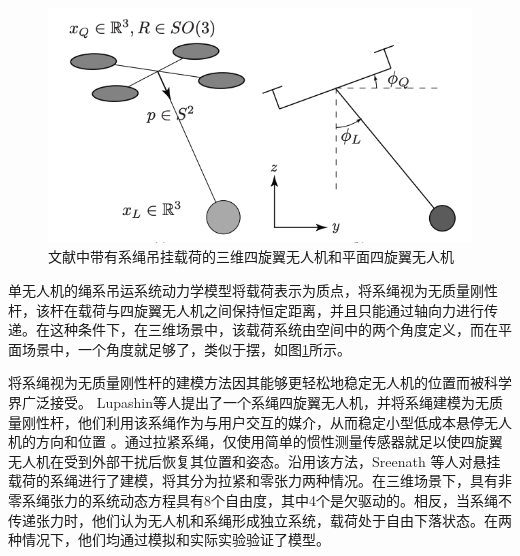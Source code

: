 \documentclass[lang=chs, degree=master, blindreview=true, winfonts=true]{yanputhesis}
\begin{document}
\begin{figure}[hbt!]
	\centering
	\includegraphics[width=28pc]{picture/1_1.png} 
	\caption{文献中带有系绳吊挂载荷的三维四旋翼无人机和平面四旋翼无人机} \label{1_1}
\end{figure}
单无人机的绳系吊运系统动力学模型将载荷表示为质点，将系绳视为无质量刚性杆，该杆在载荷与四旋翼无人机之间保持恒定距离，并且只能通过轴向力进行传递。在这种条件下，在三维场景中，该载荷系统由空间中的两个角度定义，而在平面场景中，一个角度就足够了，类似于摆\cite{sun2021novel}，如图\ref{1_1}所示。

将系绳视为无质量刚性杆的建模方法因其能够更轻松地稳定无人机的位置而被科学界广泛接受。
Lupashin等人\cite{lupashin2013stabilization}提出了一个系绳四旋翼无人机，并将系绳建模为无质量刚性杆，他们利用该系绳作为与用户交互的媒介，从而稳定小型低成本悬停无人机的方向和位置  。通过拉紧系绳，仅使用简单的惯性测量传感器就足以使四旋翼无人机在受到外部干扰后恢复其位置和姿态。沿用该方法，Sreenath 等人\cite{sreenath2013trajectory}对悬挂载荷的系绳进行了建模，将其分为拉紧和零张力两种情况。在三维场景下，具有非零系绳张力的系统动态方程具有8个自由度，其中4个是欠驱动的。相反，当系绳不传递张力时，他们认为无人机和系绳形成独立系统，载荷处于自由下落状态。在两种情况下，他们均通过模拟和实际实验验证了模型。
\end{document}
